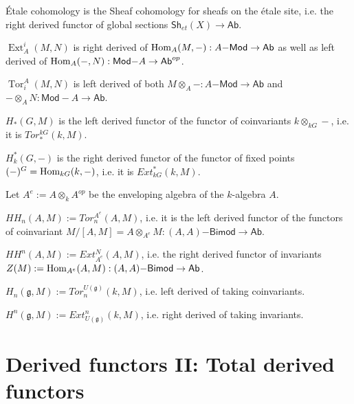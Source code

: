 \documentclass[fontsize=11pt,fleqn,a4paper]{scrartcl}
\begin{document}
\begin{example}
Étale cohomology is the Sheaf cohomology for sheafs on the étale site, i.e. the right derived functor of global sections $\mathsf{Sh}_{et}(X) \to \mathsf{Ab}$.
\end{example}

\begin{example}
$\operatorname{Ext}_A^i(M,N)$ is right derived of $\operatorname{Hom}_A(M,-): A\mathsf{-Mod} \to \mathsf{Ab}$ as well as left derived of $\operatorname{Hom}_A(-,N): \mathsf{Mod-}A\to\mathsf{Ab}^{op}$.

$\operatorname{Tor}_i^A(M,N)$ is left derived of both $M\otimes_A -: A\mathsf{-Mod}\to\mathsf{Ab}$ and $ -\otimes_A N:\mathsf{Mod-}A\to\mathsf{Ab}$.
\end{example}

\begin{example}
$H_\ast(G,M)$ is the left derived functor of the functor of coinvariants $k \otimes_{kG} -$, i.e. it is $Tor_\ast^{kG}(k,M)$.

$H_k^\ast(G,-)$ is the right derived functor of the functor of fixed points $(-)^G = \operatorname{Hom}_{kG}(k,-)$, i.e. it is $Ext_{kG}^\ast(k,M)$.
\end{example}

\begin{example}
Let $A^e := A\otimes_k A^{op}$ be the enveloping algebra of the $k$-algebra $A$.

$HH_n(A,M) := Tor_n^{A^e}(A,M)$, i.e. it is the left derived functor of the functors of coinvariant $M/[A,M] = A\otimes_{A^e} M: (A,A)\mathsf{-Bimod} \to \mathsf{Ab}$.

$HH^n(A,M) := Ext_{A^e}^N(A,M)$, i.e. the right derived functor of invariants $Z(M) := \operatorname{Hom}_{A^e}(A,M): (A,A)\mathsf{-Bimod} \to \mathsf{Ab}$.
\end{example}

\begin{example}
$H_n(\mathfrak{g},M) := Tor_n^{U(\mathfrak{g})}(k,M)$, i.e. left derived of taking coinvariants.

$H^n(\mathfrak{g},M) := Ext^n_{U(\mathfrak{g})}(k,M)$, i.e. right derived of taking invariants.
\end{example}

\section{Derived functors II: Total derived functors}
\end{document}

